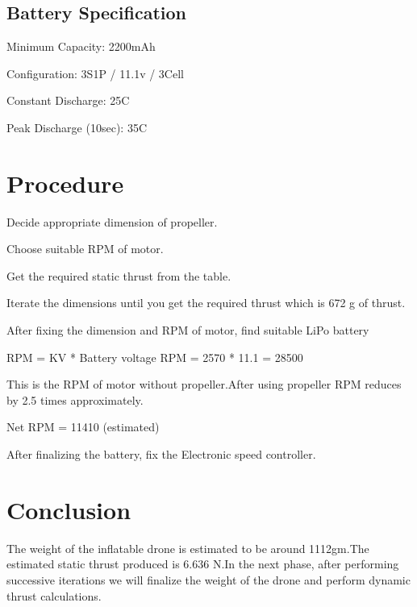 \subsection{Battery Specification}

\item Minimum Capacity: 2200mAh

\item Configuration: 3S1P / 11.1v / 3Cell

\item Constant Discharge: 25C

\item Peak Discharge (10sec): 35C
\section{Procedure}

\item Decide appropriate dimension of propeller.
\item Choose suitable RPM of motor.
\item Get the required static thrust from the table.
\item Iterate the dimensions until you get the required thrust which is 672 g of thrust.
\item After fixing the dimension and RPM of motor, find suitable LiPo battery
\item RPM = KV * Battery voltage
RPM = 2570 * 11.1 = 28500
\item This is the RPM of motor without propeller.After using propeller RPM reduces by 2.5 times approximately.
\item Net RPM = 11410 (estimated)
\item After finalizing the battery, fix the Electronic speed controller.

  
\section{Conclusion} 
The weight of the inflatable drone is estimated to be around 1112gm.The estimated static thrust produced is 6.636 N.In the next phase, after performing successive iterations we will finalize the weight of the drone and perform dynamic thrust calculations.

